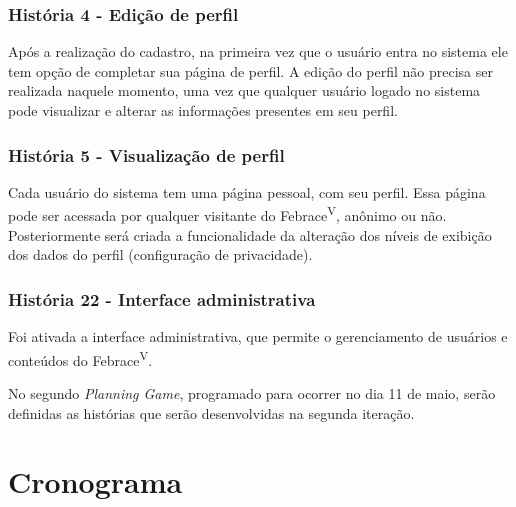\documentclass[a4paper,12pt,font=plain,header=plain]{abnt}
\begin{document}
    \subsection{História 4 - Edição de perfil}
      Após a realização do cadastro, na primeira vez que o usuário entra no sistema ele tem opção de completar sua página de perfil. A edição do perfil não precisa ser realizada naquele momento, uma vez que qualquer usuário logado no sistema pode visualizar e alterar as informações presentes em seu perfil.

    \subsection{História 5 - Visualização de perfil}
      Cada usuário do sistema tem uma página pessoal, com seu perfil. Essa página pode ser acessada por qualquer visitante do Febrace\textsuperscript{V}, anônimo ou não. Posteriormente será criada a funcionalidade da alteração dos níveis de exibição dos dados do perfil (configuração de privacidade).

    \subsection{História 22 - Interface administrativa}
      Foi ativada a interface administrativa, que permite o gerenciamento de usuários e conteúdos do Febrace\textsuperscript{V}.

    No segundo \textit{Planning Game}, programado para ocorrer no dia 11 de maio, serão definidas as histórias que serão desenvolvidas na segunda iteração.

\chapter{Cronograma}
\end{document}

